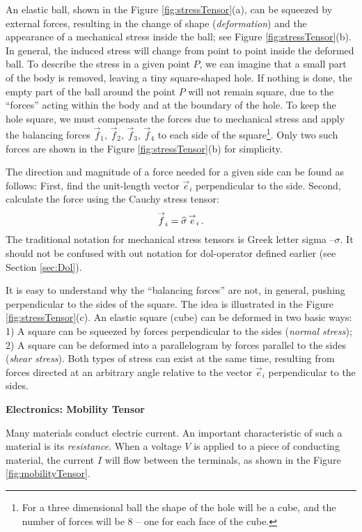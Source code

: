 An elastic ball, shown in the Figure \ref{fig:stressTensor}(a), can be
squeezed by external forces, resulting in the change of shape
(\emph{deformation}) and the appearance of a mechanical stress inside
the ball; see Figure \ref{fig:stressTensor}(b). In general, the induced
stress will change from point to point inside the deformed ball. To
describe the stress in a given point $P$, we can imagine that a small
part of the body is removed, leaving a tiny square-shaped hole. If
nothing is done, the empty part of the ball around the point $P$ will
not remain square, due to the ``forces'' acting within the body and at
the boundary of the hole. To keep the hole square, we must compensate
the forces due to mechanical stress and apply the balancing forces
$\vec{f}_1,\,\vec{f}_2,\,\vec{f}_3,\,\vec{f}_4$ to each side of the
square\footnote{For a three dimensional ball the shape of the hole
will be a cube, and the number of forces will be 8 -- one for each
face of the cube.}. Only two such forces are shown in the Figure
\ref{fig:stressTensor}(b) for simplicity.

The direction and magnitude of a force needed for a given side can be
found as follows: First, find the unit-length vector $\vec{e}_i$
perpendicular to the side. Second, calculate the force using the
Cauchy stress tensor:
\[
\overset{\rightarrow}{f}_i = \widehat{\sigma}\,\overset{\rightarrow}{e}_i\,.
\]
The traditional notation for mechanical stress tensors is Greek letter
sigma --$\sigma$. It should not be confused with out notation for
dol-operator defined earlier (see Section \ref{sec:Dol}).

It is easy to understand why the ``balancing forces'' are not, in
general, pushing perpendicular to the sides of the square. The idea is
illustrated in the Figure \ref{fig:stressTensor}(c). An elastic square
(cube) can be deformed in two basic ways: 1) A square can be squeezed
by forces perpendicular to the sides (\emph{normal stress}); 2) A
square can be deformed into a parallelogram by forces parallel to the
sides (\emph{shear stress}). Both types of stress can exist at the
same time, resulting from forces directed at an arbitrary angle
relative to the vector $\vec{e}_i$ perpendicular to the sides.

\begin{flushleft}
{\bf Electronics: Mobility Tensor}

Many materials conduct electric current. An important
characteristic of such a material is its \emph{resistance}. When a
voltage $V$ is applied to a piece of conducting material, the current
$I$ will flow between the terminals, as shown in the Figure
\ref{fig:mobilityTensor}.
\end{flushleft}


